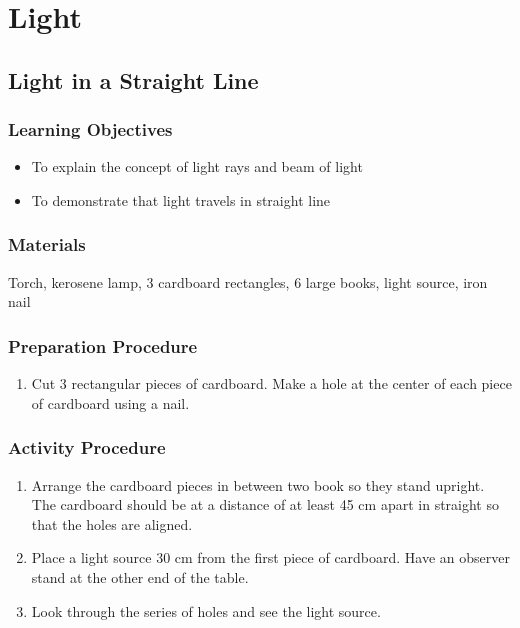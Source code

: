 \section{Light}

\subsection{Light in a Straight Line}

\subsubsection*{Learning Objectives}
\begin{itemize}
\item{To explain the concept of light rays and beam of light} 
\item{To demonstrate that light travels in straight line} 
\end{itemize}

\subsubsection*{Materials}
Torch, kerosene lamp, 3 cardboard rectangles, 6 large books, light source, iron nail

\subsubsection*{Preparation Procedure}
\begin{enumerate}
\item{Cut 3 rectangular pieces of cardboard. Make a hole at the center of each piece of cardboard using a nail.} 
\end{enumerate}

\subsubsection*{Activity Procedure}
\begin{enumerate}
\item{Arrange the cardboard pieces in between two book so they stand upright. The cardboard should be at a distance of at least 45 cm apart in straight so that the holes are aligned.} 
\item{Place a light source 30 cm from the first piece of cardboard. Have an observer stand at the other end of the table.} 
\item{Look through the series of holes and see the light source.} 
\end{enumerate}

